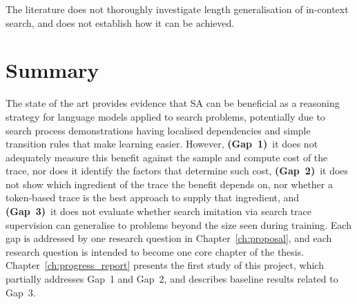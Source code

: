 \begin{tcolorbox}[title=Gap 3: Length generalisation, colback=ThesisBlue!5, colframe=ThesisBlue, fonttitle=\bfseries, fontupper=\itshape]
The literature does not thoroughly investigate length generalisation of in-context search, and does not establish how it can be achieved.
\end{tcolorbox}

\section{Summary}
\label{sec:bg_summary}

The state of the art provides evidence that SA can be beneficial as a reasoning strategy for language models applied to search problems, potentially due to search process demonstrations having localised dependencies and simple transition rules that make learning easier.
However, \textbf{(Gap~1)}~it does not adequately measure this benefit against the sample and compute cost of the trace, nor does it identify the factors that determine such cost, \textbf{(Gap~2)}~it does not show which ingredient of the trace the benefit depends on, nor whether a token-based trace is the best approach to supply that ingredient, and \textbf{(Gap~3)}~it does not evaluate whether search imitation via search trace supervision can generalise to problems beyond the size seen during training.
Each gap is addressed by one research question in Chapter~\ref{ch:proposal}, and each research question is intended to become one core chapter of the thesis.
Chapter~\ref{ch:progress_report} presents the first study of this project, which partially addresses Gap~1 and Gap~2, and describes baseline results related to Gap~3.
